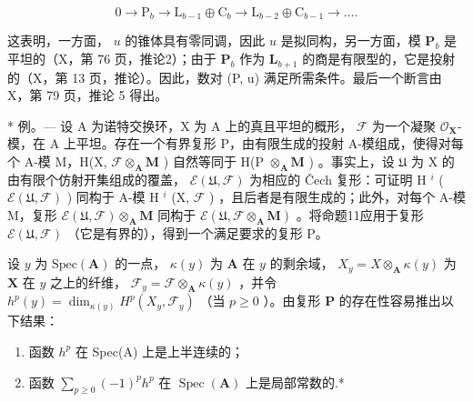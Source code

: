 \[
0 \rightarrow \mathrm{P} _ {b} \rightarrow \mathrm{L} _ {b - 1} \oplus \mathrm{C} _ {b} \rightarrow \mathrm{L} _ {b - 2} \oplus \mathrm{C} _ {b - 1} \rightarrow \dots .
\]

这表明，一方面， \(u\) 的锥体具有零同调，因此 \(u\) 是拟同构，另一方面，模 \(\mathbf{P}_{b}\) 是平坦的（X，第 76 页，推论2）；由于 \(\mathbf{P}_{b}\) 作为 \(\mathbf{L}_{b+1}\) 的商是有限型的，它是投射的（X，第 13 页，推论）。因此，数对 (P, u) 满足所需条件。最后一个断言由 X，第 79 页，推论 5 得出。

* 例。--- 设 A 为诺特交换环，X 为 A 上的真且平坦的概形， \(\mathcal{F}\) 为一个凝聚 \(\mathcal{O}_{\mathbf{X}}\)-模，在 A 上平坦。存在一个有界复形 P，由有限生成的投射 A-模组成，使得对每个 A-模 M，H(X, \(\mathcal{F} \otimes_{\mathbf{A}} \mathbf{M}\) ) 自然等同于 H(P \(\otimes_{\mathbf{A}} \mathbf{M}\) ) 。事实上，设 \(\mathfrak{U}\) 为 X 的由有限个仿射开集组成的覆盖， \(\mathcal{E}(\mathfrak{U}, \mathcal{F})\) 为相应的 Čech 复形：可证明 H \(^{i}\) ( \(\mathcal{E}(\mathfrak{U}, \mathcal{F})\) ) 同构于 A-模 H \(^{i}\) (X, \(\mathcal{F}\) ) ，且后者是有限生成的；此外，对每个 A-模 M，复形 \(\mathcal{E}(\mathfrak{U}, \mathcal{F}) \otimes_{\mathbf{A}} \mathbf{M}\) 同构于 \(\mathcal{E}(\mathfrak{U}, \mathcal{F} \otimes_{\mathbf{A}} \mathbf{M})\) 。将命题11应用于复形 \(\mathcal{E}(\mathfrak{U}, \mathcal{F})\) （它是有界的），得到一个满足要求的复形 P。

设 \(y\) 为 \(\text{Spec}(\mathbf{A})\) 的一点， \(\kappa(y)\) 为 \(\mathbf{A}\) 在 \(y\) 的剩余域， \(X_y = X \otimes_{\mathbf{A}} \kappa(y)\) 为 \(\mathbf{X}\) 在 \(y\) 之上的纤维， \(\mathcal{F}_y = \mathcal{F} \otimes_{\mathbf{A}} \kappa(y)\) ，并令 \(h^p(y) = \dim_{\kappa(y)} H^p(X_y, \mathcal{F}_y)\) （当 \(p \geqslant 0\) ）。由复形 \(\mathbf{P}\) 的存在性容易推出以下结果：

\begin{enumerate}
\def\labelenumi{(\roman{enumi})}
\item
  函数 \(h^{p}\) 在 Spec(A) 上是上半连续的；
\item
  函数 \(\sum_{p\geqslant 0}(-1)^{p}h^{p}\) 在 \(\operatorname {Spec}(\mathbf{A})\) 上是局部常数的.*
\end{enumerate}

